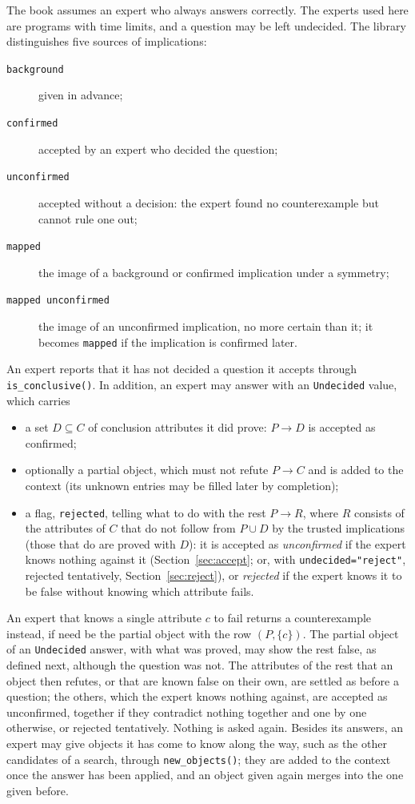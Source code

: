 \documentclass[11pt,a4paper]{article}
\theoremstyle{definition}
\theoremstyle{remark}
\newcommand{\code}[1]{\texttt{#1}}
\begin{document}
The book assumes an expert who always answers correctly. The experts used here are programs with time limits, and a question may be left undecided. The library distinguishes five sources of implications:
\begin{description}
  \item[\code{background}] given in advance;
  \item[\code{confirmed}] accepted by an expert who decided the question;
  \item[\code{unconfirmed}] accepted without a decision: the expert found no counterexample but cannot rule one out;
  \item[\code{mapped}] the image of a background or confirmed implication under a symmetry;
  \item[\code{mapped unconfirmed}] the image of an unconfirmed implication, no more certain than it; it becomes \code{mapped} if the implication is confirmed later.
\end{description}
An expert reports that it has not decided a question it accepts through \code{is\_conclusive()}. In addition, an expert may answer with an \code{Undecided} value, which carries
\begin{itemize}
  \item a set $D \subseteq C$ of conclusion attributes it did prove: $P \to D$ is accepted as confirmed;
  \item optionally a partial object, which must not refute $P \to C$ and is added to the context (its unknown entries may be filled later by completion);
  \item a flag, \code{rejected}, telling what to do with the rest $P \to R$, where $R$ consists of the attributes of $C$ that do not follow from $P \cup D$ by the trusted implications (those that do are proved with $D$): it is accepted as \emph{unconfirmed} if the expert knows nothing against it (Section~\ref{sec:accept}; or, with \code{undecided="reject"}, rejected tentatively, Section~\ref{sec:reject}), or \emph{rejected} if the expert knows it to be false without knowing which attribute fails.
\end{itemize}
An expert that knows a single attribute $c$ to fail returns a counterexample instead, if need be the partial object with the row $(P, \{c\})$. The partial object of an \code{Undecided} answer, with what was proved, may show the rest false, as defined next, although the question was not. The attributes of the rest that an object then refutes, or that are known false on their own, are settled as before a question; the others, which the expert knows nothing against, are accepted as unconfirmed, together if they contradict nothing together and one by one otherwise, or rejected tentatively. Nothing is asked again. Besides its answers, an expert may give objects it has come to know along the way, such as the other candidates of a search, through \code{new\_objects()}; they are added to the context once the answer has been applied, and an object given again merges into the one given before.
\end{document}
